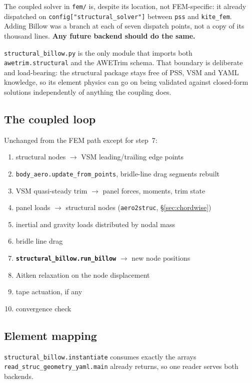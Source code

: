 \documentclass[11pt,a4paper]{article}
\newcommand{\code}[1]{\texttt{\small #1}}
\begin{document}
The coupled solver in \code{fem/} is, despite its location, not FEM-specific:
it already dispatched on \code{config["structural\_solver"]} between \code{pss}
and \code{kite\_fem}. Adding Billow was a branch at each of seven dispatch
points, not a copy of its thousand lines. \textbf{Any future backend should do
the same.}

\code{structural\_billow.py} is the only module that imports both
\code{awetrim.structural} and the AWETrim schema. That boundary is deliberate
and load-bearing: the structural package stays free of PSS, VSM and YAML
knowledge, so its element physics can go on being validated against closed-form
solutions independently of anything the coupling does.

\subsection{The coupled loop}

Unchanged from the FEM path except for step~7:

\begin{enumerate}[leftmargin=2em]
  \item structural nodes $\rightarrow$ VSM leading/trailing edge points
  \item \code{body\_aero.update\_from\_points}, bridle-line drag segments rebuilt
  \item VSM quasi-steady trim $\rightarrow$ panel forces, moments, trim state
  \item panel loads $\rightarrow$ structural nodes (\code{aero2struc}, \S\ref{sec:chordwise})
  \item inertial and gravity loads distributed by nodal mass
  \item bridle line drag
  \item \textbf{\code{structural\_billow.run\_billow}} $\rightarrow$ new node positions
  \item Aitken relaxation on the node displacement
  \item tape actuation, if any
  \item convergence check
\end{enumerate}

\subsection{Element mapping}

\code{structural\_billow.instantiate} consumes exactly the arrays
\code{read\_struc\_geometry\_yaml.main} already returns, so one reader serves
both backends.
\end{document}
